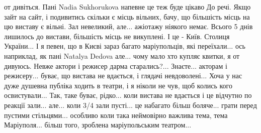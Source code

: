 от дивіться. Пані Nadia Sukhorukova напевне це теж буде цікаво До речі. Якщо
зайт на сайт, і подивитись скільки є місць вільних, бачу, що більшість місць на
цю виставу є вільні. Зал невеликий, але... ажіотажу ніякого немає. Всього 5
днів лишилось до вистави, більшість місць не викуплені. І це - Київ. Столиця
України... І я певен, що в Києві зараз багато маріупольців, які переїхали...
ось наприклад, як пані Natalya Dedova але... чому мало хто купляє квитки, я от
дивуюсь. Невже актори і режисер дарма старались?... Знаєте... акторам і
режисеру... буває, що вистава не вдається, і глядачі невдоволені... Хоча у нас
дуже душевна публіка ходить в театри, і я ніколи не чув, щоб колись кого
освистували... Так, таке буває, рідко... коли вистава не вдається і це відчутно
по реакції зали... але... коли 3/4 зали пусті... це набагато більш боляче...
грати перед пустими стільцями... особливо коли така неймовірно важлива тема,
тема Маріуполя... більш того, зроблена маріупольським театром...

